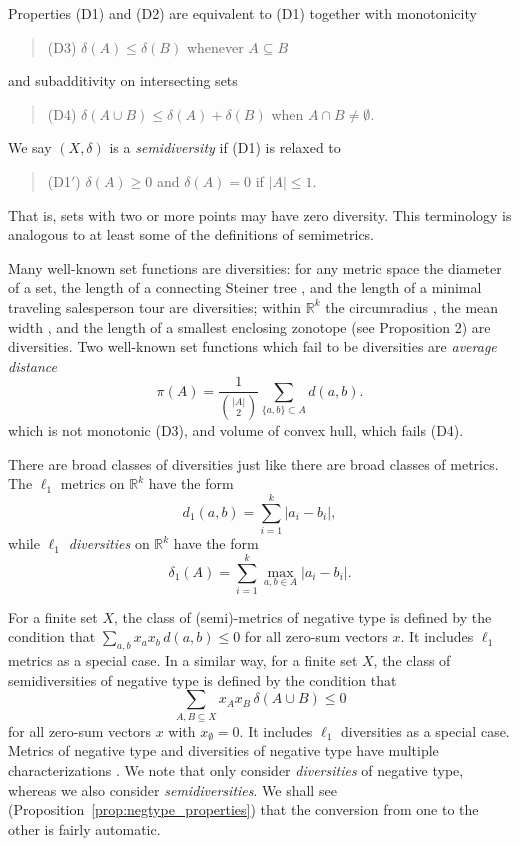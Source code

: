 \documentclass[11pt]{article}
\renewcommand{\Re}{\mathbb{R}}
\begin{document}
Properties (D1) and (D2) are equivalent \cite{BryantNiesEtal21} to (D1) together with monotonicity
\begin{quotation}\noindent (D3) $\delta(A) \leq \delta(B)$ whenever $A \subseteq B$ \end{quotation}
and subadditivity on intersecting sets
\begin{quotation}
\noindent (D4) $\delta(A \cup B) \leq \delta(A)+ \delta(B)$ when $A \cap B \neq \emptyset$.
\end{quotation}
\noindent We say $(X,\delta)$ is a {\em semidiversity} if (D1) is relaxed to 
\begin{quotation}\noindent  (D1$'$) $\delta(A)\geq 0$ and $\delta(A)=0$ if $|A|\leq 1$.\end{quotation}
That is, sets with two or more points may have zero diversity. This terminology is analogous to at least some of the definitions of semimetrics. 

Many well-known set functions are diversities: for any metric space the diameter of a set, the length of a connecting Steiner tree \cite{BryantTupper12}, and the length of a minimal traveling salesperson tour \cite{BryantTupper14} are diversities; within $\Re^k$ the circumradius \cite{bryant2023diversities}, the mean width \cite{BryantTupper14}, and the length of a smallest enclosing zonotope (see Proposition 2) are diversities. Two well-known set functions which fail to be diversities are 
{\em average distance}
\[
\pi(A)
  = \frac{1}{\binom{|A|}{2}}
    \sum_{\{a,b\}\subset A} d(a,b).
\]
which is not monotonic (D3), and volume of convex hull, which fails (D4).

There are broad classes of diversities just like there are broad classes of metrics. The $\ell_1$ metrics on $\Re^k$
have the form 
\[d_1(a,b) = \sum_{i=1}^k |a_i - b_i|,\]
while {\em $\ell_1$ diversities} on $\Re^k$ \cite{BryantTupper14} have the form
\[\delta_1(A) = \sum_{i=1}^k \max_{a,b \in A} |a_i - b_i|.\]

For a finite set $X$, the class of (semi)-metrics of  negative type  is defined by the condition that  
$\sum_{a,b} x_a x_b \,d(a,b) \leq 0$
for all zero-sum vectors $x$. It includes $\ell_1$ metrics as a special case. In a similar way, for a finite set $X$, the class of semidiversities of negative type is defined by the condition that
\begin{equation}
     \sum_{A,B \subseteq X} x_A x_B\, \delta(A \cup B) \leq 0  \label{eq:negtype}
\end{equation}
for all zero-sum vectors $x$ with $x_\emptyset=0$. It includes $\ell_1$ diversities as a special case.  Metrics of negative type and diversities of negative type have multiple  characterizations \cite{DezaLaurent97,WuBryantEtal19}. We note that \cite{WuBryantEtal19} only consider {\em diversities} of negative type, whereas we also consider {\em semidiversities}. We shall see (Proposition~\ref{prop:negtype_properties}) that the conversion from one to the other is fairly automatic.
\end{document}
